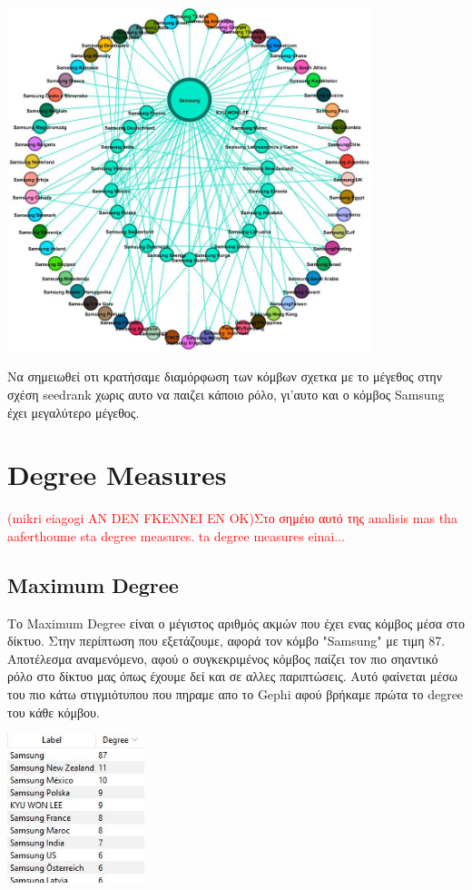 \documentclass[12pt]{article}
\begin{document}
	\begin{center}
		\includegraphics[width=0.8\textwidth]{photos-files/section5/section5_photo1.JPG}
	\end{center}
	Να σημειωθεί οτι κρατήσαμε διαμόρφωση των κόμβων σχετκα με το μέγεθος στην σχέση seedrank χωρις αυτο να παιζει κάποιο ρόλο, γι'αυτο και ο κόμβος Samsung έχει μεγαλύτερο μέγεθος.
	\label{chap:component_measures_5}
	
	
	\newpage
	\section{Degree Measures}
	\textcolor{red}{(mikri eiagogi AN DEN FKENNEI EN OK)Στο σημέιο αυτό της analisis mas tha aaferthoume sta degree measures. ta degree measures einai...}
		
	\subsection{Maximum Degree}
	Το Maximum Degree είναι ο μέγιστος αριθμός ακμών που έχει ενας κόμβος μέσα στο δίκτυο. Στην περίπτωση που εξετάζουμε, αφορά τον κόμβο "Samsung" με τιμη 87. Αποτέλεσμα αναμενόμενο, αφού ο συγκεκριμένος κόμβος παίζει τον πιο σηαντικό ρόλο στο δίκτυο μας όπως έχουμε δεί και σε αλλες παριπτώσεις. Αυτό φαίνεται μέσω του πιο κάτω στιγμιότυπου που πηραμε απο το Gephi αφού βρήκαμε πρώτα το degree του κάθε κόμβου.
	\begin{center}
		\includegraphics[width=0.3\textwidth]{photos-files/section6/maximum_degree.JPG}
	\end{center}
	
\end{document}
